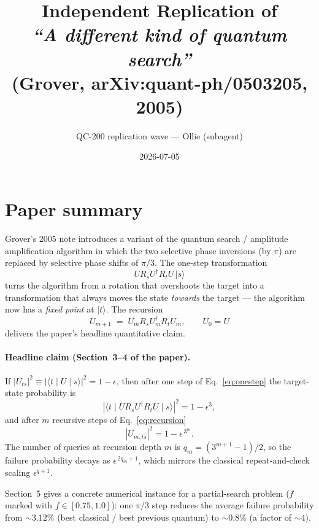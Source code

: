\documentclass[11pt]{article}
\title{Independent Replication of \\
       \emph{``A different kind of quantum search''} \\
       (Grover, arXiv:quant-ph/0503205, 2005)}
\author{QC-200 replication wave --- Ollie (subagent)}
\date{2026-07-05}
\begin{document}
\maketitle

\section{Paper summary}

Grover's 2005 note introduces a variant of the quantum search / amplitude
amplification algorithm in which the two selective phase inversions (by
$\pi$) are replaced by selective phase shifts of $\pi/3$. The one-step
transformation
\begin{equation}
U R_s U^{\dagger} R_t U \,\lvert s\rangle
\label{eq:onestep}
\end{equation}
turns the algorithm from a rotation that overshoots the target into a
transformation that always moves the state \emph{towards} the target ---
the algorithm now has a \emph{fixed point} at $\lvert t\rangle$. The
recursion
\begin{equation}
U_{m+1} \;=\; U_m R_s U_m^{\dagger} R_t U_m,
\qquad U_0 = U
\label{eq:recursion}
\end{equation}
delivers the paper's headline quantitative claim.

\paragraph{Headline claim (Section~3--4 of the paper).}
If $|U_{ts}|^{2} \equiv |\langle t \mid U \mid s\rangle|^{2} = 1-\epsilon$,
then after one step of Eq.~\eqref{eq:onestep} the target-state probability
is
\begin{equation}
|\langle t \mid U R_s U^{\dagger} R_t U \mid s\rangle|^{2} = 1 - \epsilon^{3},
\label{eq:onestepP}
\end{equation}
and after $m$ recursive steps of Eq.~\eqref{eq:recursion}
\begin{equation}
|U_{m,ts}|^{2} = 1 - \epsilon^{\,3^{m}}.
\label{eq:mstepP}
\end{equation}
The number of queries at recursion depth $m$ is
$q_m = (3^{m+1}-1)/2$, so the failure probability decays as
$\epsilon^{\,2q_m+1}$, which mirrors the classical repeat-and-check
scaling $\epsilon^{q+1}$.

Section~5 gives a concrete numerical instance for a partial-search
problem ($f$ marked with $f \in [0.75, 1.0]$): one $\pi/3$ step reduces
the average failure probability from $\sim 3.12\%$ (best classical /
best previous quantum) to $\sim 0.8\%$ (a factor of $\sim 4$).
\end{document}

